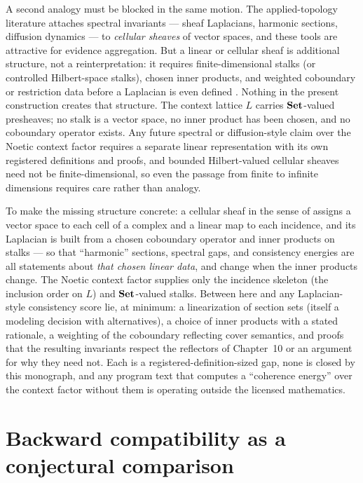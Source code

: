 A second analogy must be blocked in the same motion. The applied-topology
literature attaches spectral invariants --- sheaf Laplacians, harmonic
sections, diffusion dynamics --- to \emph{cellular sheaves} of vector
spaces, and these tools are attractive for evidence aggregation. But a
linear or cellular sheaf is additional structure, not a reinterpretation:
it requires finite-dimensional stalks (or controlled Hilbert-space stalks),
chosen inner products, and weighted coboundary or restriction data before a
Laplacian is even defined \cite{hansenghrist}. Nothing in the present
construction creates that structure. The context lattice $L$ carries
$\mathbf{Set}$-valued presheaves; no stalk is a vector space, no inner product has
been chosen, and no coboundary operator exists. Any future spectral or
diffusion-style claim over the Noetic context factor requires a separate
linear representation with its own registered definitions and proofs, and
bounded Hilbert-valued cellular sheaves need not be finite-dimensional, so
even the passage from finite to infinite dimensions requires care rather
than analogy.

To make the missing structure concrete: a cellular sheaf in the sense of
\cite{hansenghrist} assigns a vector space to each cell of a complex and
a linear map to each incidence, and its Laplacian is built from a chosen
coboundary operator and inner products on stalks --- so that
``harmonic'' sections, spectral gaps, and consistency energies are all
statements about \emph{that chosen linear data}, and change when the
inner products change. The Noetic context factor supplies only the
incidence skeleton (the inclusion order on $L$) and $\mathbf{Set}$-valued
stalks. Between here and any Laplacian-style consistency score lie, at
minimum: a linearization of section sets (itself a modeling decision
with alternatives), a choice of inner products with a stated rationale,
a weighting of the coboundary reflecting cover semantics, and proofs
that the resulting invariants respect the reflectors of Chapter~10 or
an argument for why they need not. Each is a registered-definition-sized
gap, none is closed by this monograph, and any program text that
computes a ``coherence energy'' over the context factor without them is
operating outside the licensed mathematics.

\section{Backward compatibility as a conjectural comparison}
\label{ch12:sec:compat}

